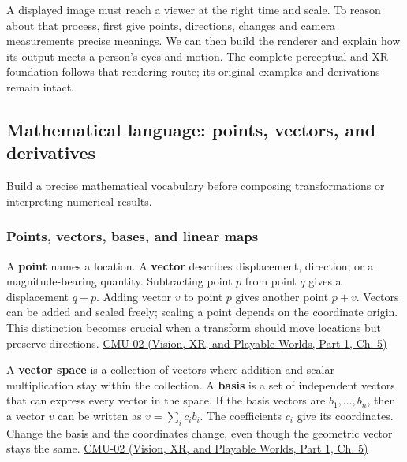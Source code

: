\hypertarget{03-visual-computing-i-ch001-from-sampled-images-to-the-mathematics-that-makes-them-controllable}{}

A displayed image must reach a viewer at the right time and scale. To reason about that process, first give points, directions, changes and camera measurements precise meanings. We can then build the renderer and explain how its output meets a person's eyes and motion. The complete perceptual and XR foundation follows that rendering route; its original examples and derivations remain intact.

\subsection{Mathematical language: points, vectors, and derivatives}\label{03-visual-computing-i-ch001-mathematical-language-points-vectors-and-derivatives}

\hypertarget{03-visual-computing-i-ch001-mathematical-language-points-vectors-and-derivatives}{}

Build a precise mathematical vocabulary before composing transformations or interpreting numerical results.

\subsubsection{Points, vectors, bases, and linear maps}\label{03-visual-computing-i-ch001-points-vectors-bases-and-linear-maps}

\hypertarget{03-visual-computing-i-ch001-points-vectors-bases-and-linear-maps}{}

A \textbf{point} names a location. A \textbf{vector} describes displacement, direction, or a magnitude-bearing quantity. Subtracting point \(p\) from point \(q\) gives a displacement \(q-p\). Adding vector \(v\) to point \(p\) gives another point \(p+v\). Vectors can be added and scaled freely; scaling a point depends on the coordinate origin. This distinction becomes crucial when a transform should move locations but preserve directions. \href{../07-Vision-XR-and-Playable-Worlds-P01/main.pdf\#04-visual-computing-ii-ch036-cmu-02---linear-algebra-preview}{CMU-02 (Vision, XR, and Playable Worlds, Part 1, Ch. 5)}

A \textbf{vector space} is a collection of vectors where addition and scalar multiplication stay within the collection. A \textbf{basis} is a set of independent vectors that can express every vector in the space. If the basis vectors are \(b_1,\ldots,b_n\), then a vector \(v\) can be written as \(v=\sum_i c_i b_i\). The coefficients \(c_i\) give its coordinates. Change the basis and the coordinates change, even though the geometric vector stays the same. \href{../07-Vision-XR-and-Playable-Worlds-P01/main.pdf\#04-visual-computing-ii-ch036-cmu-02---linear-algebra-preview}{CMU-02 (Vision, XR, and Playable Worlds, Part 1, Ch. 5)}

